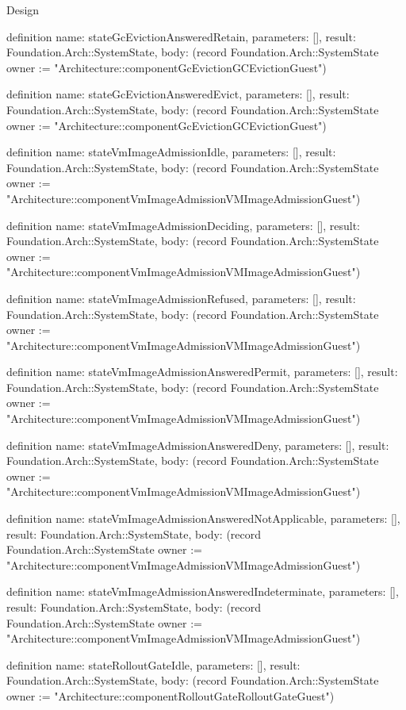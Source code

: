 \begin{lexlean}{Design}
\begin{semanticmodule}
definition{
  name: stateGcEvictionAnsweredRetain,
  parameters: [],
  result: Foundation.Arch::SystemState,
  body: (record Foundation.Arch::SystemState {owner := "Architecture::componentGcEvictionGCEvictionGuest"})
}

definition{
  name: stateGcEvictionAnsweredEvict,
  parameters: [],
  result: Foundation.Arch::SystemState,
  body: (record Foundation.Arch::SystemState {owner := "Architecture::componentGcEvictionGCEvictionGuest"})
}

definition{
  name: stateVmImageAdmissionIdle,
  parameters: [],
  result: Foundation.Arch::SystemState,
  body: (record Foundation.Arch::SystemState {owner := "Architecture::componentVmImageAdmissionVMImageAdmissionGuest"})
}

definition{
  name: stateVmImageAdmissionDeciding,
  parameters: [],
  result: Foundation.Arch::SystemState,
  body: (record Foundation.Arch::SystemState {owner := "Architecture::componentVmImageAdmissionVMImageAdmissionGuest"})
}

definition{
  name: stateVmImageAdmissionRefused,
  parameters: [],
  result: Foundation.Arch::SystemState,
  body: (record Foundation.Arch::SystemState {owner := "Architecture::componentVmImageAdmissionVMImageAdmissionGuest"})
}

definition{
  name: stateVmImageAdmissionAnsweredPermit,
  parameters: [],
  result: Foundation.Arch::SystemState,
  body: (record Foundation.Arch::SystemState {owner := "Architecture::componentVmImageAdmissionVMImageAdmissionGuest"})
}

definition{
  name: stateVmImageAdmissionAnsweredDeny,
  parameters: [],
  result: Foundation.Arch::SystemState,
  body: (record Foundation.Arch::SystemState {owner := "Architecture::componentVmImageAdmissionVMImageAdmissionGuest"})
}

definition{
  name: stateVmImageAdmissionAnsweredNotApplicable,
  parameters: [],
  result: Foundation.Arch::SystemState,
  body: (record Foundation.Arch::SystemState {owner := "Architecture::componentVmImageAdmissionVMImageAdmissionGuest"})
}

definition{
  name: stateVmImageAdmissionAnsweredIndeterminate,
  parameters: [],
  result: Foundation.Arch::SystemState,
  body: (record Foundation.Arch::SystemState {owner := "Architecture::componentVmImageAdmissionVMImageAdmissionGuest"})
}

definition{
  name: stateRolloutGateIdle,
  parameters: [],
  result: Foundation.Arch::SystemState,
  body: (record Foundation.Arch::SystemState {owner := "Architecture::componentRolloutGateRolloutGateGuest"})
}


\end{semanticmodule}
\end{lexlean}
